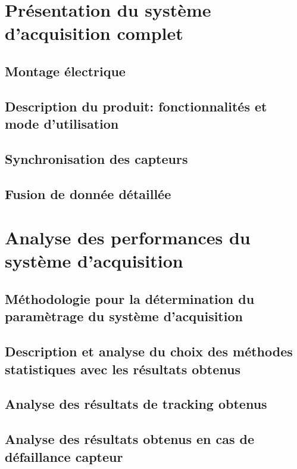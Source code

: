 \documentclass[a4paper]{article}
\begin{document}
\newpage

\section{Présentation du système d'acquisition complet}
	
	\subsection{Montage électrique}
		
	\subsection{Description du produit: fonctionnalités et mode d’utilisation}
		
	\subsection{Synchronisation des capteurs}
		
	\subsection{Fusion de donnée détaillée}
		

\newpage

\section{Analyse des performances du système d'acquisition}
	
	\subsection{Méthodologie pour la détermination du paramètrage du système d'acquisition}
		
	\subsection{Description et analyse du choix des méthodes statistiques avec les résultats obtenus}
		
	\subsection{Analyse des résultats de tracking obtenus}
		
	\subsection{Analyse des résultats obtenus en cas de défaillance capteur}
		
\end{document}
